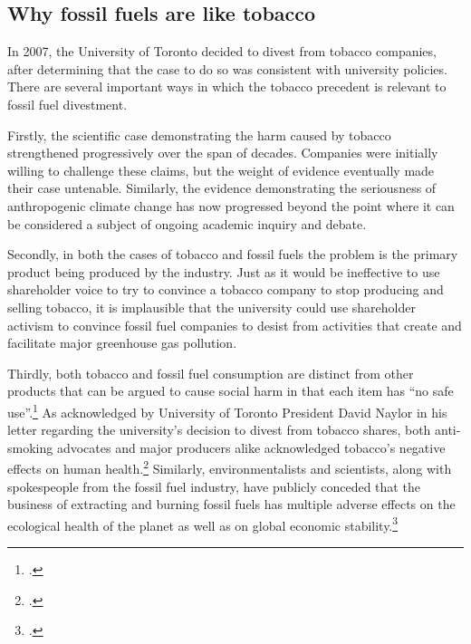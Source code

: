 	\subsection{Why fossil fuels are like tobacco}
	\label{sec:LikeTobacco}



In 2007, the University of Toronto decided to divest from tobacco companies, after determining that the case to do so was consistent with university policies.
There are several important ways in which the tobacco precedent is relevant to fossil fuel divestment.



Firstly, the scientific case demonstrating the harm caused by tobacco strengthened progressively over the span of decades.
Companies were initially willing to challenge these claims, but the weight of evidence eventually made their case untenable.
Similarly, the evidence demonstrating the seriousness of anthropogenic climate change has now progressed beyond the point where it can be considered a subject of ongoing academic inquiry and debate.



Secondly, in both the cases of tobacco and fossil fuels the problem is the primary product being produced by the industry.
Just as it would be ineffective to use shareholder voice to try to convince a tobacco company to stop producing and selling tobacco, it is implausible that the university could use shareholder activism to convince fossil fuel companies to desist from activities that create and facilitate major greenhouse gas pollution.



Thirdly, both tobacco and fossil fuel consumption are distinct from other products that can be argued to cause social harm in that each item has ``no safe use''.\footcite[See: ][p. 9]{TobaccoReport_2007}
As acknowledged by University of Toronto President David Naylor in his letter regarding the university's decision to divest from tobacco shares, both anti-smoking advocates and major producers alike acknowledged tobacco's negative effects on human health.\footcite[][]{TStarSellOff}  
Similarly, environmentalists and scientists, along with spokespeople from the fossil fuel industry, have publicly conceded that the business of extracting and burning fossil fuels has multiple adverse effects on the ecological health of the planet as well as on global economic stability.\footcite[See, for example: ][p. 3--18]{OilIndustryVanDenHove}



